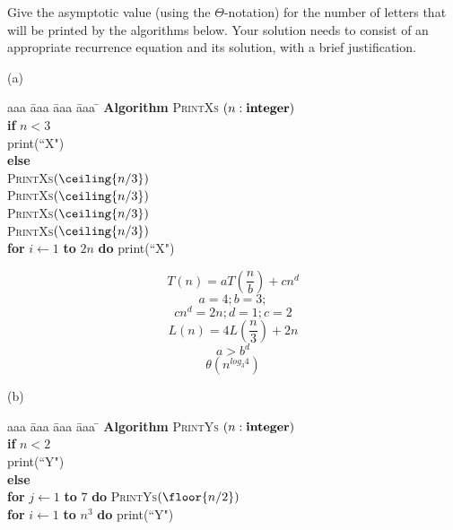 
\begin{problem}
Give the asymptotic value (using the $\Theta$-notation)
for the number of letters that will be printed by the algorithms below.
Your solution needs to consist of an appropriate recurrence 
equation and its solution, with a brief justification.

\bigskip
\noindent
(a)\ \ 
\begin{minipage}[t]{3in}
\begin{tabbing}
aaa \= aaa \= aaa \= aaa \=  \kill
\textbf{Algorithm} \textsc{PrintXs} $(n: \mbox{\bf integer})$ \\
          \> \textbf{if} $n < 3$ \\
          \>\>  print(``X") \\
          \>\textbf{else} \\
          \>\>  \textsc{PrintXs}$(\ceiling{n/3})$\\
          \>\>  \textsc{PrintXs}$(\ceiling{n/3})$\\
          \>\>  \textsc{PrintXs}$(\ceiling{n/3})$\\
          \>\>  \textsc{PrintXs}$(\ceiling{n/3})$\\
      \>\> \textbf{for} $i \leftarrow 1$ \textbf{to} $2n$ \textbf{do} print(``X")
\end{tabbing}
\end{minipage}

\begin{solution}
\[ T(n) = aT( \frac{n}{b} ) + cn^{d} \]
\[ a = 4; b = 3; \]
\[ cn^{d} = 2n; d = 1; c = 2 \]
\[ L(n) = 4L( \frac{n}{3} ) + 2n \]
\[ a > b^{d} \]
\[ \theta(n^{log_{3}4}) \]
\end{solution}

\bigskip
\noindent
(b)\ \
\begin{minipage}[t]{3in}
\begin{tabbing}
aaa \= aaa \= aaa \= aaa \=  \kill
\textbf{Algorithm} \textsc{PrintYs} $(n: \mbox{\bf integer})$ \\
          \> \textbf{if} $n < 2$ \\
          \>\>  print(``Y") \\
          \>\textbf{else} \\
          \>\>  \textbf{for} $j \leftarrow 1$ \textbf{to} $7$ 
					\textbf{do} \textsc{PrintYs}$(\floor{n/2})$\\
      \>\> \textbf{for} $i \leftarrow 1$ \textbf{to} $n^3$ \textbf{do} print(``Y")
\end{tabbing}
\end{minipage}


\end{problem}
